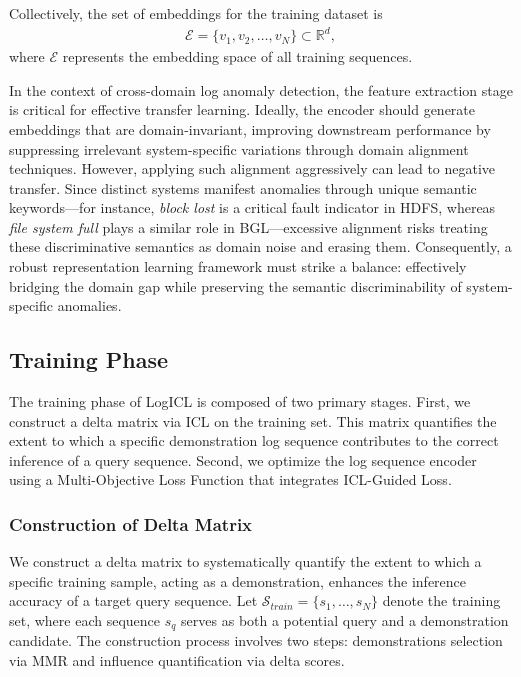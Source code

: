 \documentclass[lettersize,journal]{IEEEtran}
\begin{document}
Collectively, the set of embeddings for the training dataset is
\begin{equation}
\begin{aligned}
\mathcal{E} = \{ v_1, v_2, \dots, v_N \} \subset \mathbb{R}^d,
\end{aligned}
\label{eq:feature vector}
\end{equation}
where $\mathcal{E}$ represents the embedding space of all training sequences.

In the context of cross-domain log anomaly detection, the feature extraction stage is critical for effective transfer learning. Ideally, the encoder should generate embeddings that are domain-invariant, improving downstream performance by suppressing irrelevant system-specific variations through domain alignment techniques. However, applying such alignment aggressively can lead to negative transfer. Since distinct systems manifest anomalies through unique semantic keywords—for instance, \textit{block lost} is a critical fault indicator in HDFS, whereas \textit{file system full} plays a similar role in BGL—excessive alignment risks treating these discriminative semantics as domain noise and erasing them. Consequently, a robust representation learning framework must strike a balance: effectively bridging the domain gap while preserving the semantic discriminability of system-specific anomalies.

\subsection{Training Phase}

The training phase of LogICL is composed of two primary stages. First, we construct a delta matrix via ICL on the training set. This matrix quantifies the extent to which a specific demonstration  log sequence contributes to the correct inference of a query sequence. 
Second, we optimize the log sequence encoder using a Multi-Objective Loss Function that integrates ICL-Guided Loss.

\subsubsection{Construction of Delta Matrix}
We construct a delta matrix to systematically quantify the extent to which a specific training sample, acting as a demonstration, enhances the inference accuracy of a target query sequence. Let $\mathcal{S}_{train}=\{s_1,\dots,s_N\}$ denote the training set, where each sequence $s_q$ serves as both a potential query and a demonstration candidate. The construction process involves two steps: demonstrations selection via MMR and influence quantification via delta scores.
\end{document}
